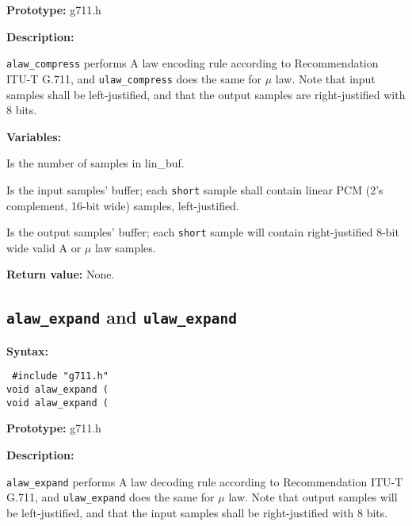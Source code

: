 {\bf Prototype: }       g711.h

{\bf Description: }

{\tt alaw\_compress} performs A law encoding rule according to
Recommendation ITU-T G.711, and {\tt ulaw\_compress} does the same for $\mu$
law. Note that input samples shall be left-justified, and that the
output samples are right-justified with 8 bits.

{\bf Variables: }
\begin{Descr}{\DescrLen}
\item[\pbox{20mm}{\em smpno}] %
               Is the number of samples in lin\_buf.

\item[\pbox{20mm}{\em lin\_buf}] %
               Is the input samples' buffer; each {\tt short} sample 
               shall contain linear PCM (2's complement, 16-bit wide) 
               samples, left-justified.

\item[\pbox{20mm}{\em log\_buf}] %
               Is the output samples' buffer; each {\tt short} sample 
               will contain right-justified 8-bit wide valid A or $\mu$ 
               law samples. 
 
\end{Descr}
        
        {\bf Return value: }        None.


\subsection{{\tt alaw\_expand} and {\tt ulaw\_expand}}

{\bf Syntax: } 

{\tt
\#include "g711.h"\\
void alaw\_expand 
         (\\
void alaw\_expand 
         (
}

{\bf Prototype: }       g711.h

{\bf Description: }

{\tt alaw\_expand} performs A law decoding rule according to
Recommendation ITU-T G.711, and {\tt ulaw\_expand} does the same for $\mu$
law. Note that output samples will be left-justified, and that the
input samples shall be right-justified with 8 bits.

